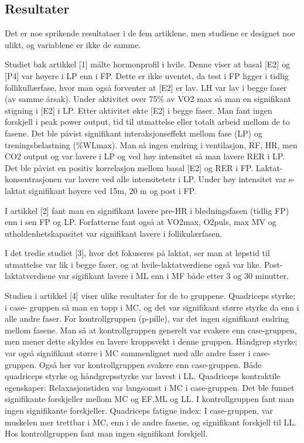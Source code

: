 \documentclass[
  letterpaper,
  DIV=11,
  numbers=noendperiod]{scrreprt}
\begin{document}
\hypertarget{resultater-2}{%
\subsection{Resultater}\label{resultater-2}}

Det er noe sprikende resultataer i de fem artiklene, men studiene er
designet noe ulikt, og variablene er ikke de samme.

Studiet bak artikkel {[}1{]} målte hormonprofil i hvile. Denne viser at
basal {[}E2{]} og {[}P4{]} var høyere i LP enn i FP. Dette er ikke
uventet, da test i FP ligger i tidlig follikullærfase, hvor man også
forventer at {[}E2{]} er lav. LH var lav i begge faser (av samme årsak).
Under aktivitet over 75\% av VO2 max så man en signifikant stigning i
{[}E2{]} i LP. Etter aktivitet økte {[}E2{]} i begge faser. Man fant
ingen forskjell i peak power output, tid til utmattelse eller totalt
arbeid mellom de to fasene. Det ble påvist signifikant
interaksjonseffekt mellom fase (LP) og treningsbelastning (\%WLmax). Man
så ingen endring i ventilasjon, RF, HR, men CO2 output og var lavere i
LP og ved høy intensitet så man lavere RER i LP. Det ble påvist en
positiv korrelasjon mellom basal {[}E2{]} og RER i FP.
Laktat-konsentrasjonen var lavere ved alle intensitetetr i LP. Under høy
intensitet var s-laktat signifikant høyere ved 15m, 20 m og post i FP.

I artikkel {[}2{]} fant man en signifikant lavere pre-HR i
blødningsfasen (tidlig FP) enn i sen FP og LP. Forfatterne fant også at
VO2max, O2puls, max MV og utholdenhetskapasitet var signifikant lavere i
follikulærfasen.

I det tredie studiet {[}3{]}, hvor det fokuseres på laktat, ser man at
løpstid til utmattelse var lik i begge faser, og at hvile-laktatverdiene
også var like. Post-laktatverdiene var sigifikant lavere i ML enn i MF
både etter 3 og 30 minutter.

Studien i artikkel {[}4{]} viser ulike resultater for de to gruppene.
Quadriceps styrke; i case- gruppen så man en topp i MC, og det var
signifikant større styrke da enn i alle andre faser. For kontrollgruppen
(p-pille), var det ingen signifikant endring mellom fasene. Man så at
kontrollgruppen generelt var svakere enn case-gruppen, men mener dette
skyldes en lavere kroppsvekt i denne gruppen. Håndgrep styrke; var også
signifikant større i MC sammenlignet med alle andre faser i
case-gruppen. Også her var kontrollgruppen svakere enn case-gruppen.
Både quadriceps styrke og håndgrepsstyrke var lavest i LL. Quadriceps
kontraktile egenskaper: Relaxasjonstiden var langsomst i MC i
case-gruppen. Det ble funnet signifikante forskjeller mellom MC og EF,ML
og LL. I kontrollgruppen fant man ingen signifikante forskjeller.
Quadriceps fatigue index: I case-gruppen, var muskelen mer trettbar i
MC, enn i de andre fasene, og signifikant forskjell til LL. Hos
kontrollgruppen fant man ingen signifikant forskjell.
\end{document}
